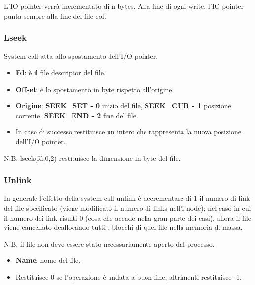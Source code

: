 \documentclass{article}
\begin{document}
\noindent L'IO pointer verrà incrementato di n bytes. Alla fine di ogni 
write, l'IO pointer punta sempre alla fine del file eof.

\subsubsection{Lseek}
\noindent {} 
\medskip

\noindent System call atta allo spostamento dell'I/O pointer.
\begin{itemize}
    \item \textbf{Fd}: è il file descriptor del file.
    \item \textbf{Offset}: è lo spostamento in byte rispetto all'origine.
    \item \textbf{Origine}: \textbf{SEEK\_SET - 0} inizio del file,
    \textbf{SEEK\_CUR - 1} posizione corrente, \textbf{SEEK\_END - 2}
     fine del file.  
    \item In caso di successo restituisce un intero che 
    rappresenta la nuova posizione dell'I/O pointer.
\end{itemize}

\noindent N.B. lseek(fd,0,2) restituisce la dimensione in byte del file.

\subsubsection{Unlink}
\noindent {} 
\medskip

\noindent In generale l'effetto della system call unlink è decrementare
di 1 il numero di link del file specificato (viene modificato il numero 
di links nell'i-node); nel caso in cui il numero dei link risulti 0 (cosa che
accade nella gran parte dei casi), allora il file viene cancellato
 deallocando tutti i blocchi di quel file nella memoria di
 massa.
 
 \noindent N.B. il file non deve essere stato necessariamente aperto dal
 processo. 
\begin{itemize}
    \item \textbf{Name}: nome del file.
    \item  Restituisce 0 se l'operazione è andata a buon fine, altrimenti 
    restituisce -1.
\end{itemize}
\end{document}
